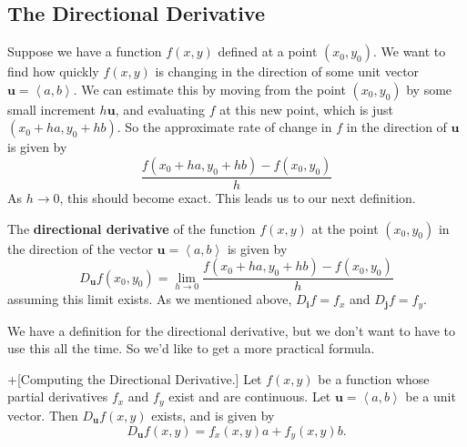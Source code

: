 \documentclass[10pt,]{book}
\newcommand{\terminology}[1]{\textbf{#1}}
\theoremstyle{ptxplainnotitle}
\theoremstyle{ptxplaintitle}
\theoremstyle{ptxplainnotitle}
\theoremstyle{ptxplaintitle}
\theoremstyle{ptxplainnotitle}
\theoremstyle{ptxplaintitle}
\theoremstyle{ptxdefinitionnotitle}
\theoremstyle{ptxdefinitiontitle}
\theoremstyle{ptxdefinitionnotitle}
\theoremstyle{ptxdefinitiontitle}
\theoremstyle{ptxdefinitionnotitle}
\theoremstyle{ptxdefinitiontitle}
\theoremstyle{ptxdefinitionnotitle}
\theoremstyle{ptxdefinitiontitle}
\theoremstyle{ptxdefinitionnotitle}
\theoremstyle{ptxdefinitiontitle}
\numberwithin{equation}{section}
\newcommand{\vv}[1]{\mathbf{#1}}
\newcommand{\dotprod}[1]{\left\langle #1 \right\rangle}
\begin{document}
\subsection[{The Directional Derivative}]{The Directional Derivative}\label{subsection-the-directional-derivative}
\hypertarget{p-1053}{}%
Suppose we have a function \(f(x,y)\) defined at a point \((x_{0},y_{0})\). We want to find how quickly \(f(x,y)\) is changing in the direction of some unit vector \(\vv{u} = \dotprod{a,b}\). We can estimate this by moving from the point \((x_{0},y_{0})\) by some small increment \(h\vv{u}\), and evaluating \(f\) at this new point, which is just \((x_{0} + ha, y_{0} + hb)\). So the approximate rate of change in \(f\) in the direction of \(\vv{u}\) is given by%
\begin{equation*}
\frac{f(x_{0}+ha, y_{0} + hb) - f(x_{0},y_{0})}{h}
\end{equation*}
As \(h\to0\), this should become exact. This leads us to our next definition.%
\begin{definition}\label{definition-directional-derivative}
\hypertarget{p-1054}{}%
The \terminology{directional derivative} of the function \(f(x,y)\) at the point \((x_{0},y_{0})\) in the direction of the vector \(\vv{u} = \dotprod{a,b}\) is given by%
\begin{equation*}
D_{\vv{u}}f(x_{0},y_{0}) = \lim_{h\to0}\frac{f(x_{0}+ha, y_{0} + hb) - f(x_{0},y_{0})}{h}
\end{equation*}
assuming this limit exists. As we mentioned above, \(D_{\vv{i}}f = f_{x}\) and \(D_{\vv{j}}f = f_{y}\).%
\end{definition}
\hypertarget{p-1055}{}%
We have a definition for the directional derivative, but we don't want to have to use this all the time. So we'd like to get a more practical formula.%
\begin{theorem}+[{Computing the Directional Derivative.}]\label{theorem-computing-the-directional-derivative}
\hypertarget{p-1056}{}%
Let \(f(x,y)\) be a function whose partial derivatives \(f_{x}\) and \(f_{y}\) exist and are continuous. Let \(\vv{u} = \dotprod{a,b}\) be a unit vector. Then \(D_{\vv{u}}f(x,y)\) exists, and is given by%
\begin{equation*}
D_{\vv{u}}f(x,y) = f_{x}(x,y)a + f_{y}(x,y)b.
\end{equation*}
%
\end{theorem}
\end{document}
